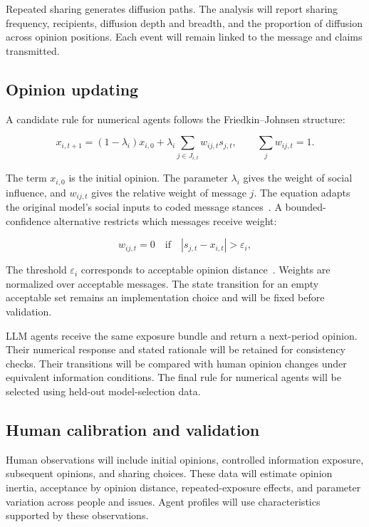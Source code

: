 \documentclass[11pt,a4paper]{article}
\begin{document}
Repeated sharing generates diffusion paths. The analysis will report sharing frequency, recipients, diffusion depth and breadth, and the proportion of diffusion across opinion positions. Each event will remain linked to the message and claims transmitted.

\subsection{Opinion updating}

A candidate rule for numerical agents follows the Friedkin--Johnsen structure:

\begin{equation*}
x_{i,t+1}
=
(1-\lambda_i)x_{i,0}
+
\lambda_i
\sum_{j\in J_{i,t}}
w_{ij,t}s_{j,t},
\qquad
\sum_jw_{ij,t}=1.
\end{equation*}

The term $x_{i,0}$ is the initial opinion. The parameter $\lambda_i$ gives the weight of social influence, and $w_{ij,t}$ gives the relative weight of message $j$. The equation adapts the original model's social inputs to coded message stances~\citep{friedkin1990}. A bounded-confidence alternative restricts which messages receive weight:

\begin{equation*}
w_{ij,t}=0
\quad\text{if}\quad
|s_{j,t}-x_{i,t}|>\varepsilon_i,
\end{equation*}

The threshold $\varepsilon_i$ corresponds to acceptable opinion distance~\citep{hegselmann2002}. Weights are normalized over acceptable messages. The state transition for an empty acceptable set remains an implementation choice and will be fixed before validation.

LLM agents receive the same exposure bundle and return a next-period opinion. Their numerical response and stated rationale will be retained for consistency checks. Their transitions will be compared with human opinion changes under equivalent information conditions. The final rule for numerical agents will be selected using held-out model-selection data.

\subsection{Human calibration and validation}

Human observations will include initial opinions, controlled information exposure, subsequent opinions, and sharing choices. These data will estimate opinion inertia, acceptance by opinion distance, repeated-exposure effects, and parameter variation across people and issues. Agent profiles will use characteristics supported by these observations.
\end{document}

